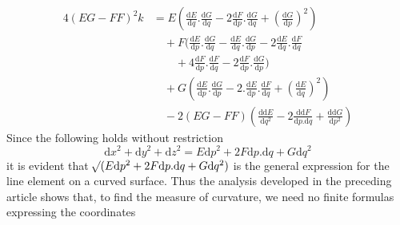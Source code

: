 \[
\begin{aligned}
4(EG-FF)^2k&=E(\tfrac{\mathrm{d}E}{\mathrm{d}q}\mathord{.}\tfrac{\mathrm{d}G}{\mathrm{d}q}-2\tfrac{\mathrm{d}F}{\mathrm{d}p}\mathord{.}\tfrac{\mathrm{d}G}{\mathrm{d}q}+(\tfrac{\mathrm{d}G}{\mathrm{d}p})^2)\\
&\quad+F(\tfrac{\mathrm{d}E}{\mathrm{d}p}\mathord{.}\tfrac{\mathrm{d}G}{\mathrm{d}q}-\tfrac{\mathrm{d}E}{\mathrm{d}q}\mathord{.}\tfrac{\mathrm{d}G}{\mathrm{d}p}-2\tfrac{\mathrm{d}E}{\mathrm{d}q}\mathord{.}\tfrac{\mathrm{d}F}{\mathrm{d}q}\\
&\qquad+4\tfrac{\mathrm{d}F}{\mathrm{d}p}\mathord{.}\tfrac{\mathrm{d}F}{\mathrm{d}q}-2\tfrac{\mathrm{d}F}{\mathrm{d}p}\mathord{.}\tfrac{\mathrm{d}G}{\mathrm{d}p})\\
&\quad+G(\tfrac{\mathrm{d}E}{\mathrm{d}p}\mathord{.}\tfrac{\mathrm{d}G}{\mathrm{d}p}-2\mathord{.}\tfrac{\mathrm{d}E}{\mathrm{d}p}\mathord{.}\tfrac{\mathrm{d}F}{\mathrm{d}q}+(\tfrac{\mathrm{d}E}{\mathrm{d}q})^2)\\
&\quad-2(EG-FF)(\tfrac{\mathrm{d}\mathrm{d}E}{\mathrm{d}q^2}-2\tfrac{\mathrm{d}\mathrm{d}F}{\mathrm{d}p\mathord{.}\mathrm{d}q}+\tfrac{\mathrm{d}\mathrm{d}G}{\mathrm{d}p^2})
\end{aligned}
\]
Since the following holds without restriction
\[
\mathrm{d}x^2+\mathrm{d}y^2+\mathrm{d}z^2=E\mathrm{d}p^2+2F\mathrm{d}p\mathord{.}\mathrm{d}q+G\mathrm{d}q^2
\]
it is evident that \(\mathord{{}^{}\!\surd}(E\mathrm{d}p^2+2F\mathrm{d}p\mathord{.}\mathrm{d}q+G\mathrm{d}q^2)\) is the general expression for the line element on a curved surface. Thus the analysis developed in the preceding article shows that, to find the measure of curvature, we need no finite formulas expressing the coordinates
